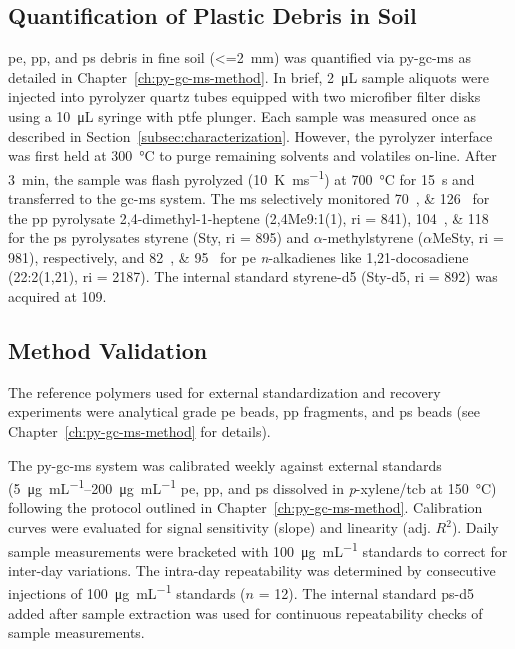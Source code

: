 \subsection{Quantification of Plastic Debris in Soil}

\ac{pe}, \ac{pp}, and \ac{ps} debris in fine soil (\SI{<=2}{\milli\meter}) was quantified via \ac{py-gc-ms} as detailed in Chapter~\ref{ch:py-gc-ms-method}.
In brief, \SI{2}{\micro\liter} sample aliquots were injected into pyrolyzer quartz tubes equipped with two microfiber filter disks using a \SI{10}{\micro\liter} syringe with \ac{ptfe} plunger.
Each sample was measured once as described in Section~\ref{subsec:characterization}. However, the pyrolyzer interface was first held at \SI{300}{\degreeCelsius} to purge remaining solvents and volatiles on-line. After \SI{3}{\minute}, the sample was flash pyrolyzed (\SI{10}{\kelvin\per\milli\second}) at \SI{700}{\degreeCelsius} for \SI{15}{\second} and transferred to the \ac{gc-ms} system. The \ac{ms} selectively monitored \SIlist{70;126}{\mz} for the \ac{pp} pyrolysate 2,4-dimethyl-1-heptene (2,4Me9:1(1), \ac{ri} = \num{841}), \SIlist{104;118}{\mz} for the \ac{ps} pyrolysates styrene (Sty, \ac{ri} = \num{895}) and $\alpha$-methylstyrene ($\alpha$MeSty, \ac{ri} = \num{981}), respectively, and \SIlist{82;95}{\mz} for \ac{pe} \textit{n}-alkadienes like 1,21-docosadiene (22:2(1,21), \ac{ri} = \num{2187}). The internal standard styrene-d5 (Sty-d5, \ac{ri} = \num{892}) was acquired at \SI{109}{\mz}.

\subsection{Method Validation}

The reference polymers used for external standardization and recovery experiments were analytical grade \ac{pe} beads, \ac{pp} fragments, and \ac{ps} beads (see Chapter~\ref{ch:py-gc-ms-method} for details).

The \ac{py-gc-ms} system was calibrated weekly against external standards (\SIrange{5}{200}{\micro\gram\per\milli\liter} \ac{pe}, \ac{pp}, and \ac{ps} dissolved in \textit{p}-xylene/\ac{tcb} at \SI{150}{\degreeCelsius}) following the protocol outlined in Chapter~\ref{ch:py-gc-ms-method}. Calibration curves were evaluated for signal sensitivity (slope) and linearity (adj. $R^2$). Daily sample measurements were bracketed with \SI{100}{\micro\gram\per\milli\liter} standards to correct for inter-day variations. The intra-day repeatability was determined by consecutive injections of \SI{100}{\micro\gram\per\milli\liter} standards ($n$ = 12). The internal standard \ac{ps}-d5 added after sample extraction was used for continuous repeatability checks of sample measurements.


